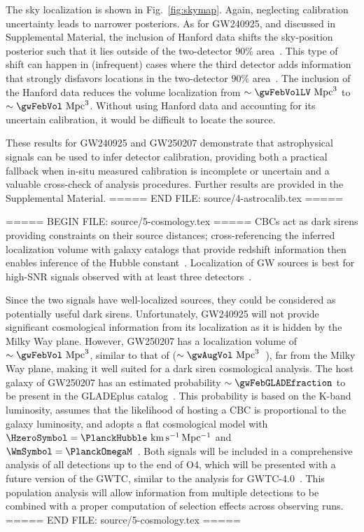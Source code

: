 The sky localization is shown in Fig.~\ref{fig:skymap}.
Again, neglecting calibration uncertainty leads to narrower posteriors.
As for \ac{GW240925}, and discussed in Supplemental Material\citesupp, the inclusion of Hanford data shifts the sky-position posterior such that it lies outside of the two-detector $90\%$ area~\cite{GCN39242}.
This type of shift can happen in (infrequent) cases where the third detector adds information that strongly disfavors locations in the two-detector $90\%$ area~\cite{Singer:2014qca,Ouzriat:2025ben}.
The inclusion of the Hanford data reduces the volume localization from $\sim\gwFebVolLV~\mathrm{Mpc}^3$ to $\sim\gwFebVol~\mathrm{Mpc}^3$.
Without using Hanford data and accounting for its uncertain calibration, it would be difficult to locate the source.

These results for \ac{GW240925} and \ac{GW250207} demonstrate that astrophysical signals can be used to infer detector calibration, providing both a practical fallback when in-situ measured calibration is incomplete or uncertain and a valuable cross-check of analysis procedures.
Further results are provided in the Supplemental Material\citesupp.
===== END FILE: source/4-astrocalib.tex =====

===== BEGIN FILE: source/5-cosmology.tex =====
\Acp{CBC} act as dark sirens providing constraints on their source distances; cross-referencing the inferred localization volume with galaxy catalogs that provide redshift information then enables inference of the Hubble constant~\cite{Schutz:1986gp,Gair:2022zsa,LIGOScientific:2025jau}.
Localization of \ac{GW} sources is best for high-\ac{SNR} signals observed with at least three detectors~\cite{Abbott:2020qfu,DelPozzo:2018dpu,Pankow:2019oxl,Emma:2024mjs,Ouzriat:2025ben}.

Since the two signals have well-localized sources, they could be considered as potentially useful dark sirens.
Unfortunately, \ac{GW240925} will not provide significant cosmological information from its localization as it is hidden by the Milky Way plane.
However, \ac{GW250207} has a localization volume of $\sim\gwFebVol~\mathrm{Mpc}^3$, similar to that of  ($\sim \gwAugVol~\mathrm{Mpc}^3$~\cite{Abbott:2020khf,LIGOScientific:2021usb}), far from the Milky Way plane, making it well suited for a dark siren cosmological analysis.
The host galaxy of \ac{GW250207} has an estimated probability $\sim\gwFebGLADEfraction$ to be present in the \ac{GLADEplus} catalog~\cite{Dalya:2018cnd,Dalya:2021ewn}.
This probability is based on the K-band luminosity, assumes that the likelihood of hosting a \ac{CBC} is proportional to the galaxy luminosity, and adopts a flat cosmological model with $\HzeroSymbol = \PlanckHubble~\mathrm{km\,s^{-1}\,Mpc^{-1}}$ and $\WmSymbol = \PlanckOmegaM$~\cite{Ade:2015xua,LIGOScientific:2025yae}.
Both signals will be included in a comprehensive analysis of all detections up to the end of \ac{O4}, which will be presented with a future version of the \ac{GWTC}, similar to the analysis for \ac{GWTC}-4.0~\cite{LIGOScientific:2025jau}.
This population analysis will allow information from multiple detections to be combined with a proper computation of selection effects across observing runs.
===== END FILE: source/5-cosmology.tex =====

